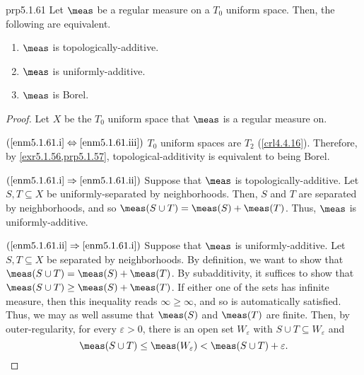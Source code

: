 \begin{prp}{}{prp5.1.61}
Let $\meas$ be a regular measure on a $T_0$ uniform space.  Then, the following are equivalent.
\begin{enumerate}
\item \label{enm5.1.61.i}$\meas$ is topologically-additive.
\item \label{enm5.1.61.ii}$\meas$ is uniformly-additive.
\item \label{enm5.1.61.iii}$\meas$ is Borel.
\end{enumerate}
\begin{proof}
Let $X$ be the $T_0$ uniform space that $\meas$ is a regular measure on.

\blankline
\noindent
$(\text{\cref{enm5.1.61.i}}\Leftrightarrow \text{\cref{enm5.1.61.iii}})$ $T_0$ uniform spaces are $T_2$ (\cref{crl4.4.16}).  Therefore, by \cref{exr5.1.56,prp5.1.57}, topological-additivity is equivalent to being Borel.

\blankline
\noindent
$(\text{\cref{enm5.1.61.i}}\Rightarrow \text{\cref{enm5.1.61.ii}})$ Suppose that $\meas$ is topologically-additive.  Let $S,T\subseteq X$ be uniformly-separated by neighborhoods.  Then, $S$ and $T$ are separated by neighborhoods, and so $\meas (S\cup T)=\meas (S)+\meas (T)$.  Thus, $\meas$ is uniformly-additive.

\blankline
\noindent
$(\text{\cref{enm5.1.61.ii}}\Rightarrow \text{\cref{enm5.1.61.i}})$ Suppose that $\meas$ is uniformly-additive.  Let $S,T\subseteq X$  be separated by neighborhoods.  By definition, we want to show that $\meas (S\cup T)=\meas (S)+\meas (T)$.  By subadditivity, it suffices to show that $\meas (S\cup T)\geq \meas (S)+\meas (T)$.  If either one of the sets has infinite measure, then this inequality reads $\infty \geq \infty$, and so is automatically satisfied.  Thus, we may as well assume that $\meas (S)$ and $\meas (T)$ are finite.  Then, by outer-regularity, for every $\varepsilon >0$, there is an open set $W_{\varepsilon}$ with $S\cup T\subseteq W_{\varepsilon}$ and
\begin{equation}
\meas (S\cup T)\leq \meas (W_{\varepsilon})<\meas (S\cup T)+\varepsilon .
\end{equation}


\end{proof}
\end{prp}

